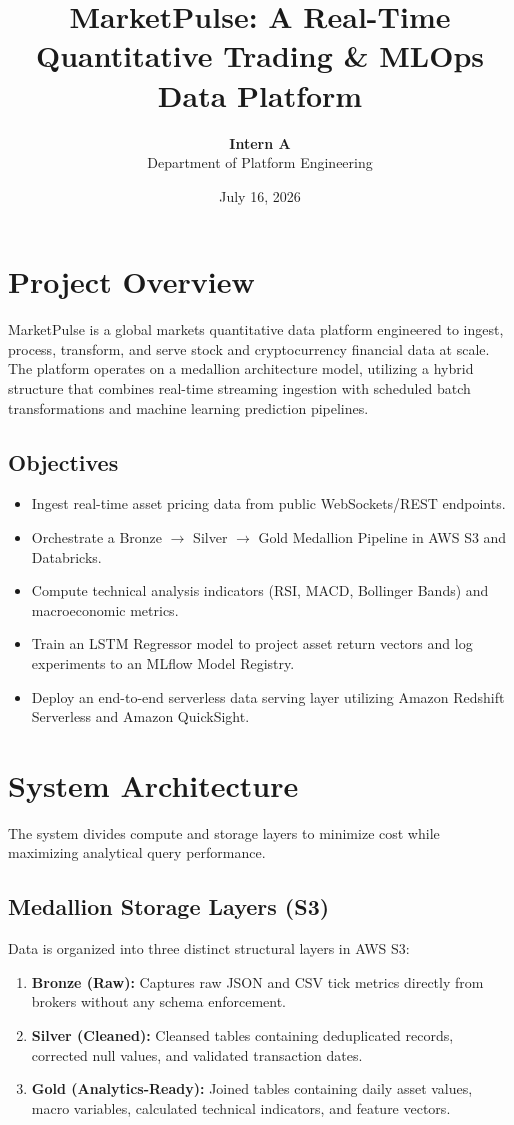 \documentclass[11pt,a4paper]{article}
\title{\textbf{MarketPulse: A Real-Time Quantitative Trading \& MLOps Data Platform}}
\author{\textbf{Intern A} \\ Department of Platform Engineering}
\date{July 16, 2026}
\begin{document}
\maketitle
\tableofcontents
\newpage

\section{Project Overview}
MarketPulse is a global markets quantitative data platform engineered to ingest, process, transform, and serve stock and cryptocurrency financial data at scale. The platform operates on a medallion architecture model, utilizing a hybrid structure that combines real-time streaming ingestion with scheduled batch transformations and machine learning prediction pipelines.

\subsection{Objectives}
\begin{itemize}
    \item Ingest real-time asset pricing data from public WebSockets/REST endpoints.
    \item Orchestrate a Bronze $\rightarrow$ Silver $\rightarrow$ Gold Medallion Pipeline in AWS S3 and Databricks.
    \item Compute technical analysis indicators (RSI, MACD, Bollinger Bands) and macroeconomic metrics.
    \item Train an LSTM Regressor model to project asset return vectors and log experiments to an MLflow Model Registry.
    \item Deploy an end-to-end serverless data serving layer utilizing Amazon Redshift Serverless and Amazon QuickSight.
\end{itemize}

\section{System Architecture}
The system divides compute and storage layers to minimize cost while maximizing analytical query performance. 

\subsection{Medallion Storage Layers (S3)}
Data is organized into three distinct structural layers in AWS S3:
\begin{enumerate}
    \item \textbf{Bronze (Raw):} Captures raw JSON and CSV tick metrics directly from brokers without any schema enforcement.
    \item \textbf{Silver (Cleaned):} Cleansed tables containing deduplicated records, corrected null values, and validated transaction dates.
    \item \textbf{Gold (Analytics-Ready):} Joined tables containing daily asset values, macro variables, calculated technical indicators, and feature vectors.
\end{enumerate}
\end{document}
